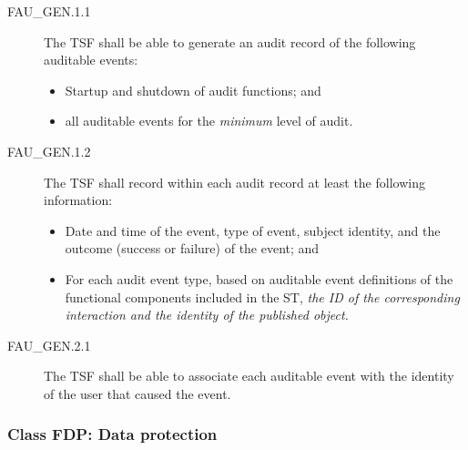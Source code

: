 \documentclass[12pt,english]{scrbook}
\begin{document}
\begin{description}
  
  \item[FAU\_GEN.1.1] The TSF shall be able to generate an audit record of the
  following auditable events:
  \begin{itemize}
      \item Startup and shutdown of audit functions; and
      \item all auditable events for the \emph{minimum} level of audit.
  \end{itemize}

\item[FAU{\_}GEN.1.2]

The TSF shall record within each audit record at least the
following information:

\begin{itemize}
\item 
Date and time of the event, type of event, subject identity,
and the outcome (success or failure) of the event; and

\item For each audit event type, based on auditable event definitions
of the functional components included in the ST, \emph{the ID of the
corresponding interaction and the identity of the published object.}
\end{itemize}

\end{description}





\begin{description}
\item[FAU{\_}GEN.2.1]

The TSF shall be able to associate each auditable event with the identity
of the user that caused the event.


\end{description}





\subsubsection{Class FDP: Data protection}
\end{document}
